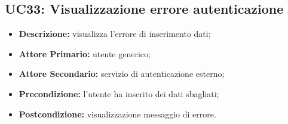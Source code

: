\subsection{UC33: Visualizzazione errore autenticazione }
\label{sec:UC33}
\begin{itemize}
    \item \textbf{Descrizione:} visualizza l'errore di inserimento dati;
    \item \textbf{Attore Primario:} utente generico;
    \item \textbf{Attore Secondario:} servizio di autenticazione esterno;
    \item \textbf{Precondizione:} l'utente ha inserito dei dati sbagliati;
    \item \textbf{Postcondizione:} visualizzazione messaggio di errore.
\end{itemize}